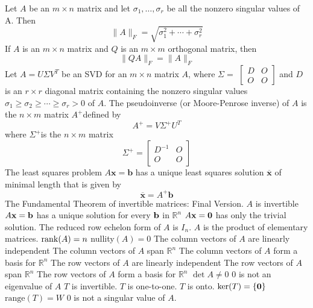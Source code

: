 \documentclass{article}
\begin{document}
\begin{outline}
            \1 Let $A$ be an $m \times n$ matrix and let $\sigma_{1}, \ldots, \sigma_{r}$ be all the nonzero singular values of A. Then
            \[\|A\|_{F}=\sqrt{\sigma_{1}^{2}+\cdots+\sigma_{r}^{2}}\]
            \1 If $A$ is an $m \times n$ matrix and $Q$ is an $m \times m$ orthogonal matrix, then
            \[\|Q A\|_{F}=\|A\|_{F}\]
            \1 Let $A=U \Sigma V^{T}$ be an SVD for an $m \times n$ matrix $A$, where $\Sigma=$ $\left[\begin{array}{ll}D & O \\ O & O\end{array}\right]$ and $D$ is an $r \times r$ diagonal matrix containing the nonzero singular values $\sigma_{1} \geq \sigma_{2} \geq \cdots \geq \sigma_{r}>0$ of $A$. The pseudoinverse (or Moore-Penrose inverse) of $A$ is the $n \times m$ matrix $A^{+}$defined by
            \[A^{+}=V \Sigma^{+} U^{T}\]
            where $\Sigma^{+}$is the $n \times m$ matrix \[\Sigma^{+}=\left[\begin{array}{cc}
            D^{-1} & O \\
            O & O
            \end{array}\right]\]
            \1 The least squares problem $A \mathbf{x}=\mathbf{b}$ has a unique least squares solution $\overline{\mathbf{x}}$ of minimal length that is given by \[\overline{\mathbf{x}}=A^{+} \mathbf{b}\]
            \1 The Fundamental Theorem of invertible matrices: Final Version. 
                \2 $A$ is invertible
                \2 $A\vb x=\vb b$ has a unique solution for every \(\vb b\) in \(\mathbb R^n\)
                \2 \(A\vb x=\vb 0\) has only the trivial solution. 
                \2 The reduced row echelon form of $A$ is \(I_n\). 
                \2 $A$ is the product of elementary matrices. 
                \2 \(\rank (A)=n\)
                \2 nullity\((A)=0\)
                \2 The column vectors of $A$ are linearly independent
                \2 The column vectors of $A$ span \(\mathbb R^n\)
                \2 The column vectors of $A$ form a basis for \(\mathbb R^n\)
                \2 The row vectors of $A$ are linearly independent
                \2 The row vectors of $A$ span \(\mathbb R^n\)
                \2 The row vectors of $A$ form a basis for \(\mathbb R^n\)
                \2 \(\det A\neq 0\)
                \2 $0$ is not an eigenvalue of $A$
                \2 $T$ is invertible. 
                \2 $T$ is one-to-one. 
                \2 $T$ is onto. 
                \2 \(\text{ker}(T)=\{\vb 0\}\)
                \2 \(\text{range}(T)=W\)
                \2 $0$ is not a singular value of $A$. 

        \end{outline}
\end{document}
